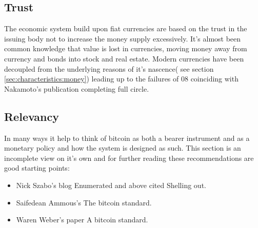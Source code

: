 \subsection{Trust}

The economic system build upon fiat currencies are based on the trust in the issuing body not to increase the money supply excessively. It's almost been common knowledge that value is lost in currencies, moving money away from currency and bonds into stock and real estate. Modern currencies have been decoupled from the underlying reasons of it's nascence( see section \ref{sec:characteristics:money}) leading up to the failures of 08 coinciding with Nakamoto's publication completing full circle.

\newpage
\noindent
\vspace{6cm}

\subsection{Relevancy}
In many ways it help to think of bitcoin as both a bearer instrument and as a monetary policy and how the system is designed as such. This section is an incomplete view on it's own and for further reading these recommendations are good starting points: 

\begin{itemize}
	\item Nick Szabo's blog Enumerated and above cited Shelling out\cite{szabo:shelling:out}.
	\item Saifedean Ammous's The bitcoin standard.\cite{ammous:bitcoin:standard}
	\item Waren Weber's paper A bitcoin standard.\cite{weber:bitcoin:standard}
\end{itemize}